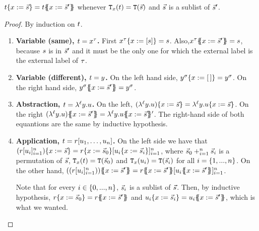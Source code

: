 \begin{lemma}
$t\{x := \vec{s}\} = t\{\!\!\{x := \vec{s}'\}\!\!\}$
whenever $\mathtt{T}_{x}(t) = \mathtt{T}(\vec{s})$ and $\vec{s}$ is a sublist of $\vec{s}'$.
\end{lemma}
\begin{proof}
By induction on $t$.
\begin{enumerate}
\item {\bf Variable (same), $t = x^\tau$.}
  First $x^\tau\{x := [s]\} = s$.
  Also,$x^\tau\{\!\!\{x := \vec{s}'\}\!\!\} = s$,
  because $s$ is in $\vec{s}'$ and it must be the only one for which the external label is the external label of $\tau$.
\item {\bf Variable (different), $t = y$.}
  On the left hand side, $y^\sigma\{x := [\,]\} = y^\sigma$.
  On the right hand side, $y^\sigma\{\!\!\{x := \vec{s}'\}\!\!\} = y^\sigma$.
\item {\bf Abstraction, $t = \lambda^{\ell} y. u$.}
  On the left, $(\lambda^{\ell} y. u)\{x := \vec{s}\} = \lambda^{\ell} y. u\{x := \vec{s}\}$.
  On the right $(\lamp{\lab}{\vartwo}{\tmthree})\sub{\var}{\ls{\tmtwo}'} = \lamp{\lab}{\vartwo}{\tmthree\sub{\var}{\ls{\tmtwo}}'}$.
  The right-hand side of both equantions are the same by inductive hypothesis.
\item {\bf Application, $t = r [u_1, \hdots, u_n]$.}
  On the left side we have that
    $(r [u_i]_{i=1}^n)\{x := \vec{s}\} =
      r\{x := \vec{s}_0\} [u_i\{x := \vec{s}_i\}]_{i=1}^n$, where
      $\vec{s}_0 +_{i=1}^{n} \vec{s}_i$ is a permutation of $\vec{s}$,
      $\mathtt{T}_{x}(t) = \mathtt{T}(\vec{s}_0)$ and
      $\mathtt{T}_{x}(u_i) = \mathtt{T}(\vec{s}_i)$ for all $i = \{1,...,n\}$.
  On the other hand, $((\tmfour [\tmthree_i]_{i=1}^n))\sub{\var}{\ls{\tmtwo}'} =
      \tmfour\sub{\var}{\ls{\tmtwo}'} [\tmthree_i\sub{\var}{\ls{\tmtwo}'}]_{i=1}^n$.

  Note that for every $i \in \{0, ..., n\}$, $\vec{s}_i$ is a sublist of $\vec{s}$.
  Then, by inductive hypothesis, $r\{x := \vec{s}_0\} = r\{\!\!\{x := \vec{s}'\}\!\!\}$
  and $u_i\{x := \vec{s}_i\} = u_i\{\!\!\{x := \vec{s}'\}\!\!\}$, which is what we wanted.
\end{enumerate}
\end{proof}

